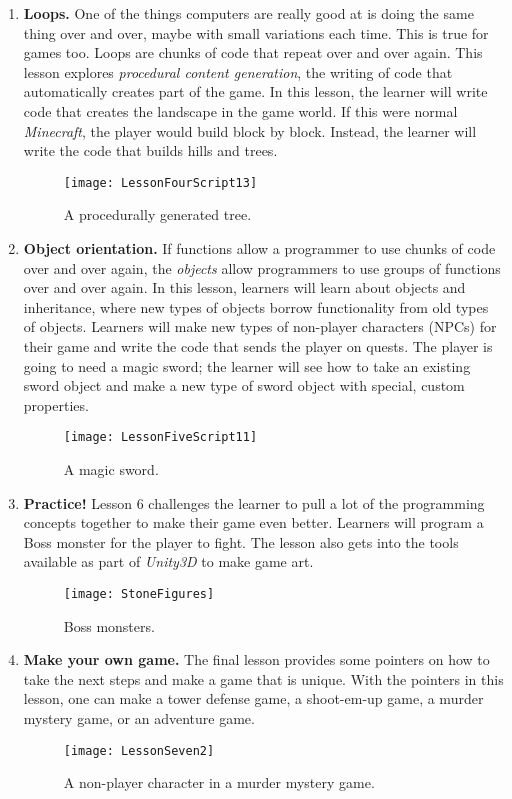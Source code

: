 \documentclass{article}
\begin{document}
\begin{enumerate}
\newpage
\item {\bf Loops.}
One of the things computers are really good at is doing the same thing over and over, maybe with small variations each time.
This is true for games too.
Loops are chunks of code that repeat over and over again.
This lesson explores {\em procedural content generation}, the writing of code that automatically creates part of the game.
In this lesson, the learner will write code that creates the landscape in the game world.
If this were normal {\em Minecraft}, the player would build block by block. 
Instead, the learner will write the code that builds hills and trees.
\begin{figure}[h]
\centering
\texttt{[image: LessonFourScript13]}
\caption{A procedurally generated tree.}
\end{figure}

\item {\bf Object orientation.}
If functions allow a programmer to use chunks of code over and over again, the {\em objects} allow programmers to use groups of functions over and over again.
In this lesson, learners will learn about objects and inheritance, where new types of objects borrow functionality from old types of objects. 
Learners will make new types of non-player characters (NPCs) for their game and write the code that sends the player on quests.
The player is going to need a magic sword; the learner will see how to take an existing sword object and make a new type of sword object with special, custom properties.
\begin{figure}[!h]
\centering
\texttt{[image: LessonFiveScript11]}%
\caption{A magic sword.}
\end{figure}

\newpage
\item {\bf Practice!}
Lesson 6 challenges the learner to pull a lot of the programming concepts together to make their game even better.
Learners will program a Boss monster for the player to fight.
The lesson also gets into the tools available as part of {\em Unity3D} to make game art.
\begin{figure}[!h]
\centering
\texttt{[image: StoneFigures]}
\caption{Boss monsters.}
\end{figure}

\item {\bf Make your own game.}
The final lesson provides some pointers on how to take the next steps and make a game that is unique.
With the pointers in this lesson, one can make a tower defense game, a shoot-em-up game, a murder mystery game, or an adventure game.
\begin{figure}[!h]
\centering
\texttt{[image: LessonSeven2]}
\caption{A non-player character in a murder mystery game.}
\end{figure}

\end{enumerate}
\end{document}
